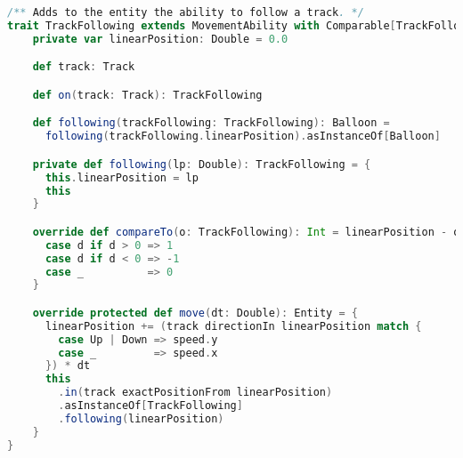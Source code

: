 \begin{lstlisting}[label=code:track-following, language=Scala, caption=Interfaccia per rimanere sul tracciato]
/** Adds to the entity the ability to follow a track. */
trait TrackFollowing extends MovementAbility with Comparable[TrackFollowing] { balloon: Balloon =>
    private var linearPosition: Double = 0.0

    def track: Track

    def on(track: Track): TrackFollowing

    def following(trackFollowing: TrackFollowing): Balloon =
      following(trackFollowing.linearPosition).asInstanceOf[Balloon]

    private def following(lp: Double): TrackFollowing = {
      this.linearPosition = lp
      this
    }

    override def compareTo(o: TrackFollowing): Int = linearPosition - o.linearPosition match {
      case d if d > 0 => 1
      case d if d < 0 => -1
      case _          => 0
    }

    override protected def move(dt: Double): Entity = {
      linearPosition += (track directionIn linearPosition match {
        case Up | Down => speed.y
        case _         => speed.x
      }) * dt
      this
        .in(track exactPositionFrom linearPosition)
        .asInstanceOf[TrackFollowing]
        .following(linearPosition)
    }
}
\end{lstlisting}